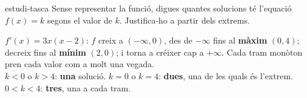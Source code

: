 \begin{apartats}
\begin{tria}{estudi-tasca}
Sense representar la funció, digues quantes solucions té l'equació $f(x)=k$ segons el valor de
$k$. Justifica-ho a partir dels extrems.

\begin{solucio}
$f'(x)=3x(x-2)$: $f$ creix a $(-\infty,0)$, des de $-\infty$ fins al \textbf{màxim} $(0,4)$; decreix
fins al \textbf{mínim} $(2,0)$; i torna a créixer cap a $+\infty$. Cada tram monòton pren cada valor
com a molt una vegada.\\
$k<0$ o $k>4$: \textbf{una} solució. \quad $k=0$ o $k=4$: \textbf{dues}, una de les quals és l'extrem.
\quad $0<k<4$: \textbf{tres}, una a cada tram.
\end{solucio}
\end{tria}

\end{apartats}
